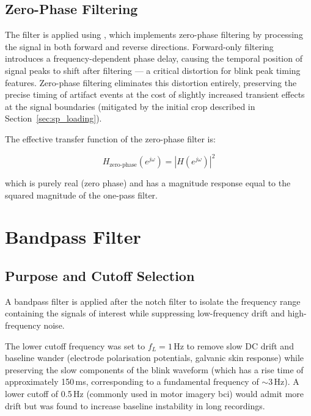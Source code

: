 \subsection{Zero-Phase Filtering}

The filter is applied using , which
implements zero-phase filtering by processing the signal in
both forward and reverse directions. Forward-only filtering
introduces a frequency-dependent phase delay, causing the
temporal position of signal peaks to shift after filtering
— a critical distortion for blink peak timing features.
Zero-phase filtering eliminates this distortion entirely,
preserving the precise timing of artifact events at the cost
of slightly increased transient effects at the signal
boundaries (mitigated by the initial crop described in
Section~\ref{sec:sp_loading}).

The effective transfer function of the zero-phase filter is:

\begin{equation}
H_{\text{zero-phase}}(e^{j\omega}) =
\left|H(e^{j\omega})\right|^2
\label{eq:zerophase}
\end{equation}

\noindent which is purely real (zero phase) and has a
magnitude response equal to the squared magnitude of the
one-pass filter.

\section{Bandpass Filter}
\label{sec:sp_bandpass}

\subsection{Purpose and Cutoff Selection}

A bandpass filter is applied after the notch filter to isolate
the frequency range containing the signals of interest while
suppressing low-frequency drift and high-frequency noise.

The lower cutoff frequency was set to $f_L = 1$\,Hz to remove
slow DC drift and baseline wander (electrode polarisation
potentials, galvanic skin response) while preserving the slow
components of the blink waveform (which has a rise time of
approximately 150\,ms, corresponding to a fundamental frequency
of $\sim$3\,Hz). A lower cutoff of 0.5\,Hz (commonly used in
motor imagery \acrshort{bci}) would admit more drift but was
found to increase baseline instability in long recordings.

